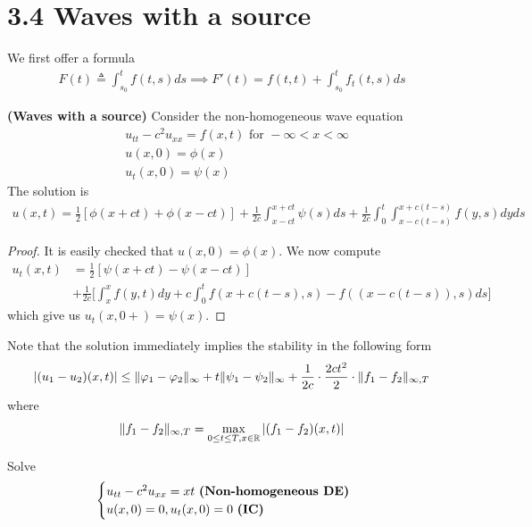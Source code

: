 \documentclass{report}
\begin{document}
\section{3.4 Waves with a source}
\begin{mdframed}
We first offer a formula  
\begin{align*}
F(t)\triangleq \int_{s_0}^tf(t,s)ds \implies F'(t)= f(t,t)+ \int_{s_0}^t f_t(t,s)ds
\end{align*}
\end{mdframed}
\begin{theorem}
\textbf{(Waves with a source)} Consider the non-homogeneous wave equation  
\begin{align*}
&u_{tt}-c^2u_{xx}=f(x,t)\text{ for }-\infty < x< \infty\\
&u(x,0)= \phi (x) \\
&u_t(x,0)=\psi (x)
\end{align*}
The solution is 
\begin{align*}
u(x,t)= \frac{1}{2}[\phi (x+ct)+ \phi (x-ct)] + \frac{1}{2c}\int_{x-ct}^{x+ct}\psi (s)ds + \frac{1}{2c}\int_0^t \int_{x-c(t-s)}^{x+c(t-s)}f(y,s)dyds
\end{align*}
\end{theorem}
\begin{proof}
It is easily checked that $u(x,0)=\phi (x)$. We now compute 
\begin{align*}
  u_t(x,t)&=\frac{1}{2}[\psi (x+ct)- \psi (x-ct)]\\
  &+ \frac{1}{2c}\Big[\int^{x}_{x}f(y,t)dy+c\int_0^t f(x+c(t-s),s) -f((x-c(t-s)),s)ds \Big]
\end{align*}
which give us $u_t(x,0+)=\psi (x)$. 
\end{proof}
\begin{mdframed}
Note that the solution immediately implies the stability in the following form 
\begin{align*}
\left|(u_1-u_2)(x,t)\right|\leq \| \varphi_1-\varphi_2 \|_{\infty} + t \| \psi_1-\psi_2 \|_\infty +  \frac{1}{2c}\cdot \frac{2ct^2}{2}\cdot \| f_1-f_2 \|_{\infty ,T}
\end{align*}
where 
\begin{align*}
\| f_1-f_2 \|_{\infty,T}= \max_{0\leq  t\leq T,x\in\mathbb{R}} \left|(f_1-f_2)(x,t)\right|
\end{align*}
\end{mdframed}
\begin{question}{}{}
Solve 
\begin{align*}
\begin{cases}
u_{tt}-c^2u_{xx}=xt\text{ \textbf{(Non-homogeneous DE)} } \\
u(x,0)=0,u_t(x,0)=0\text{ \textbf{(IC)} }
\end{cases}
\end{align*}
\end{question}
\end{document}

